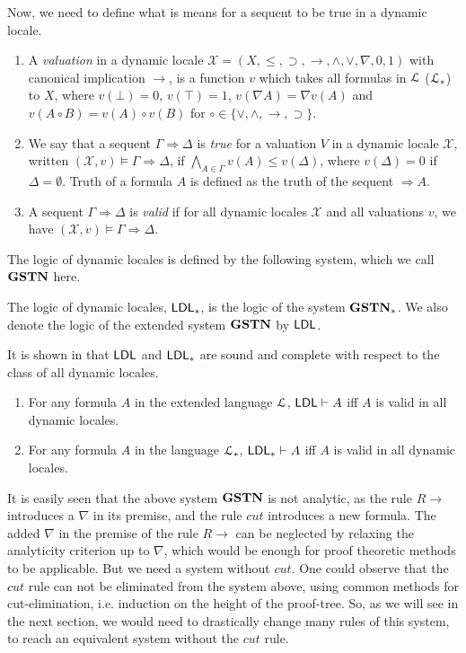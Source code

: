   Now, we need to define what is means for a sequent to be true in a dynamic locale.
  \begin{dfn}\quad
    \begin{enumerate}
      \item A \emph{valuation} in a dynamic locale $\mathcal{X} = (X, \le, \supset, \rightarrow, \wedge, \vee, \nabla, 0, 1)$ with canonical implication $\rightarrow$, is a function $v$ which takes all formulas in $\mathcal{L}$ ($\mathcal{L}_*$) to $X$, where $v(\bot) = 0$, $v(\top) = 1$, $v(\nabla A) = \nabla v(A)$ and  $v(A \circ B) = v(A) \circ v(B)$ for $\circ \in \{\vee, \wedge, \rightarrow, \supset\}$.
      \item We say that a sequent $\Gamma \Rightarrow \Delta$ is \emph{true} for a valuation $V$ in a dynamic locale $\mathcal{X}$, written $(\mathcal{X}, v) \vDash \Gamma \Rightarrow \Delta$, if $\bigwedge_{A \in \Gamma} v(A) \le v(\Delta)$, where $v(\Delta) = 0$ if $\Delta = \emptyset$. Truth of a formula $A$ is defined as the truth of the sequent $\Rightarrow A$.
      \item A sequent $\Gamma \Rightarrow \Delta$ is \emph{valid} if for all dynamic locales $\mathcal{X}$ and all valuations $v$, we have $(\mathcal{X}, v) \vDash \Gamma \Rightarrow \Delta$.
    \end{enumerate}
  \end{dfn}
  
  The logic of dynamic locales is defined by the following system, which we call $\mathbf{GSTN}$ here.
  

  The logic of dynamic locales, $\mathsf{LDL}_*$, is the logic of the system $\mathbf{GSTN}_*$. We also denote the logic of the extended system $\mathbf{GSTN}$ by $\mathsf{LDL}$.
  
  It is shown in \cite{amir} that $\mathsf{LDL}$ and $\mathsf{LDL}_*$ are sound and complete with respect to the class of all dynamic locales.
  \begin{thm} \quad
    \begin{enumerate}
      \item For any formula $A$ in the extended language $\mathcal{L}$, $\mathsf{LDL} \vdash A$ iff $A$ is valid in all dynamic locales.
      \item For any formula $A$ in the language $\mathcal{L}_*$, $\mathsf{LDL}_* \vdash A$ iff $A$ is valid in all dynamic locales.
    \end{enumerate}
  \end{thm}
  
  It is easily seen that the above system $\mathbf{GSTN}$ is not analytic, as the rule $R \rightarrow$ introduces a $\nabla$ in its premise, and the rule $cut$ introduces a new formula. The added $\nabla$ in the premise of the rule $R \rightarrow$ can be neglected by relaxing the analyticity criterion up to $\nabla$, which would be enough for proof theoretic methods to be applicable. But we need a system without $cut$.  One could observe that the $cut$ rule can not be eliminated from the system above, using common methods for cut-elimination, i.e. induction on the height of the proof-tree. So, as we will see in the next section, we would need to drastically change many rules of this system, to reach an equivalent system without the $cut$ rule.
